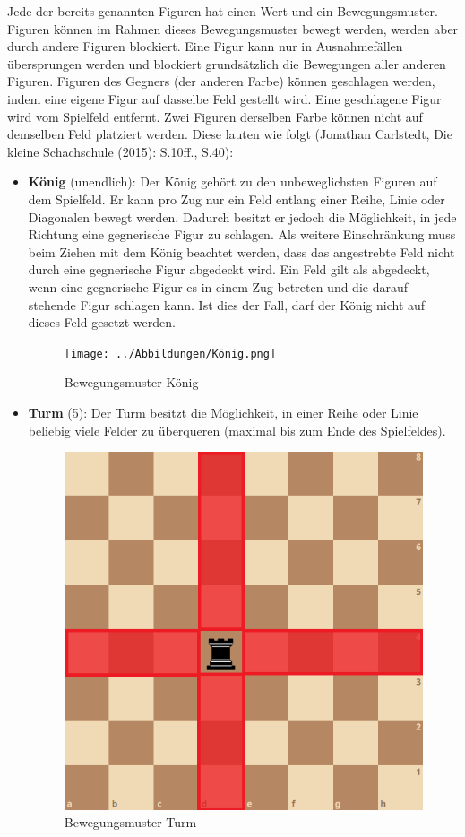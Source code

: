 \documentclass[12pt]{article}
\begin{document}
Jede der bereits genannten Figuren hat einen Wert und ein
Bewegungsmuster. Figuren können im Rahmen dieses Bewegungsmuster bewegt
werden, werden aber durch andere Figuren blockiert. Eine Figur kann nur
in Ausnahmefällen übersprungen werden und blockiert grundsätzlich die
Bewegungen aller anderen Figuren. Figuren des Gegners (der anderen
Farbe) können geschlagen werden, indem eine eigene Figur auf dasselbe
Feld gestellt wird. Eine geschlagene Figur wird vom Spielfeld entfernt.
Zwei Figuren derselben Farbe können nicht auf demselben Feld platziert
werden. Diese lauten wie folgt (Jonathan Carlstedt, Die kleine
Schachschule (2015): S.10ff., S.40): 
\begin{itemize}
	\item 
		\textbf{König} (unendlich): Der
		König gehört zu den unbeweglichsten Figuren auf dem Spielfeld. Er kann
		pro Zug nur ein Feld entlang einer Reihe, Linie oder Diagonalen bewegt
		werden. Dadurch besitzt er jedoch die Möglichkeit, in jede Richtung eine
		gegnerische Figur zu schlagen. Als weitere Einschränkung muss beim
		Ziehen mit dem König beachtet werden, dass das angestrebte Feld nicht
		durch eine gegnerische Figur abgedeckt wird. Ein Feld gilt als
		abgedeckt, wenn eine gegnerische Figur es in einem Zug betreten und die
		darauf stehende Figur schlagen kann. Ist dies der Fall, darf der König
		nicht auf dieses Feld gesetzt werden.
		\begin{figure}
			\centering
			\texttt{[image: ../Abbildungen/König.png]} 
			\caption{Bewegungsmuster König}
		\end{figure}
	\item 
		\textbf{Turm} (5): Der Turm
		besitzt die Möglichkeit, in einer Reihe oder Linie beliebig viele Felder
		zu überqueren (maximal bis zum Ende des Spielfeldes).
		
		\begin{figure}
			\centering
			\includegraphics{../Abbildungen/Turm.png} 
			\caption{Bewegungsmuster Turm}
		\end{figure}
	

\end{itemize}
\end{document}
